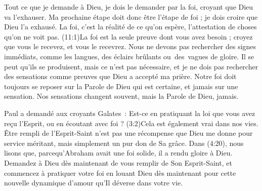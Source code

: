 Tout ce que je demande à Dieu, je dois le demander par la foi,
 croyant que Dieu va l'exhauser. Ma prochaine étape doit donc être
 l'étape de foi ; je dois croire que Dieu l'a exhausé.
 La foi, c'est la réalité de ce qu'on espère,
 l'attestation de choses qu'on ne voit pas.
 (11:1)La foi est la seule preuve dont vous avez besoin ;
 croyez que vous le recevez, et vous le recevrez.
 Nous ne devons pas rechercher des signes immédiats, comme les langues,
 des éclairs brûlants ou~des~vagues de gloire.
 Il se peut qu'ils se produisent, mais ce n'est pas nécessaire,
 et je ne dois pas rechercher des sensations comme preuves
 que Dieu a accepté ma prière. Notre foi doit toujours se reposer
 sur la Parole de Dieu qui est certaine, et jamais sur une sensation.
 Nos sensations changent souvent, mais la Parole de Dieu, jamais.

Paul a demandé aux croyants Galates~:
 \Og Est-ce en pratiquant la loi que vous avez reçu l'Esprit,
 ou en écoutant avec foi ? \Fg{}
 (3:2)Cela est également vrai dans nos vies.
 Être rempli de l'Esprit-Saint n'est pas une récompense que Dieu
 me donne pour service méritant, mais simplement un pur don de Sa grâce.
 Dans (4:20), nous lisons que, parcequ'Abraham avait
 une foi solide, il a rendu gloire à Dieu.
 Demandez à Dieu dès maintenant de vous remplir de Son Esprit-Saint,
 et commencez à pratiquer votre foi en louant Dieu dès maintenant
 pour cette nouvelle dynamique d'amour qu'Il déverse dans votre vie.
\closechapter

